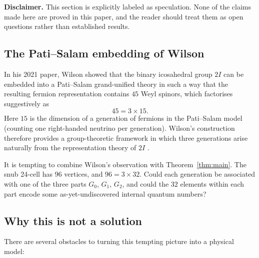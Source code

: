 \documentclass[10pt,reqno]{amsart}
\theoremstyle{plain}
\theoremstyle{definition}
\begin{document}
\textbf{Disclaimer.} This section is explicitly labeled as speculation. None of the claims made here are proved in this paper, and the reader should treat them as open questions rather than established results.

\subsection{The Pati--Salam embedding of Wilson}

In his 2021 paper, Wilson showed that the binary icosahedral group $2I$ can be embedded into a Pati--Salam grand-unified theory in such a way that the resulting fermion representation contains $45$ Weyl spinors, which factorises suggestively as
\begin{equation}
45 = 3 \times 15.
\end{equation}
Here $15$ is the dimension of a generation of fermions in the Pati--Salam model (counting one right-handed neutrino per generation). Wilson's construction therefore provides a group-theoretic framework in which three generations arise naturally from the representation theory of $2I$ \cite{Wilson2021}.

It is tempting to combine Wilson's observation with Theorem~\ref{thm:main}. The snub 24-cell has $96$ vertices, and $96 = 3 \times 32$. Could each generation be associated with one of the three parts $G_0$, $G_1$, $G_2$, and could the $32$ elements within each part encode some as-yet-undiscovered internal quantum numbers?

\subsection{Why this is not a solution}

There are several obstacles to turning this tempting picture into a physical model:
\end{document}
